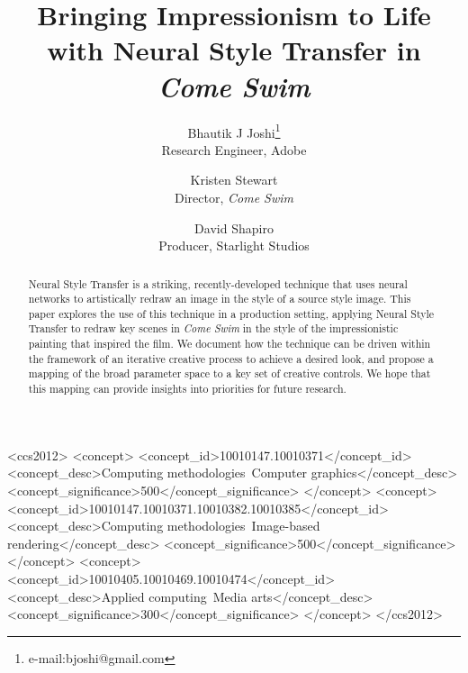 \documentclass{acmsiggraph}
\title{Bringing Impressionism to Life with Neural Style Transfer in \textit{Come Swim}}
\author{Bhautik J Joshi\thanks{e-mail:bjoshi@gmail.com}\\Research Engineer, Adobe
       \and
       Kristen Stewart\\Director, \textit{Come Swim}
       \and
       David Shapiro\\Producer, Starlight Studios}
\begin{document}


\maketitle



\begin{abstract}

Neural Style Transfer is a striking, recently-developed technique that uses neural networks to artistically redraw an image in the style of a source style image. This paper explores the use of this technique in a production setting, applying Neural Style Transfer to redraw key scenes in \textit{Come Swim} in the style of the impressionistic painting that inspired the film. We document how the technique can be driven within the framework of an iterative creative process to achieve a desired look, and propose a mapping of the broad parameter space to a key set of creative controls. We hope that this mapping can provide insights into priorities for future research.

\end{abstract}

%
%
\begin{CCSXML}
<ccs2012>
<concept>
<concept_id>10010147.10010371</concept_id>
<concept_desc>Computing methodologies~Computer graphics</concept_desc>
<concept_significance>500</concept_significance>
</concept>
<concept>
<concept_id>10010147.10010371.10010382.10010385</concept_id>
<concept_desc>Computing methodologies~Image-based rendering</concept_desc>
<concept_significance>500</concept_significance>
</concept>
<concept>
<concept_id>10010405.10010469.10010474</concept_id>
<concept_desc>Applied computing~Media arts</concept_desc>
<concept_significance>300</concept_significance>
</concept>
</ccs2012>
\end{CCSXML}

\end{document}
